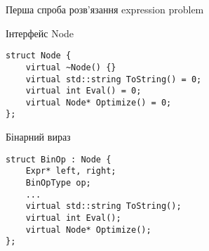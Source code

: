 \documentclass{beamer}
\begin{document}
	\begin{frame}[fragile]{Перша спроба розв'язання expression problem}

 \begin{alertblock}{Інтерфейс Node}
\begin{verbatim}
struct Node {
    virtual ~Node() {}
    virtual std::string ToString() = 0;
	virtual int Eval() = 0;
	virtual Node* Optimize() = 0;
};
\end{verbatim}
 \end{alertblock}
\begin{block}{Бінарний вираз}
\begin{verbatim}
struct BinOp : Node {
	Expr* left, right;
	BinOpType op;
	...
	virtual std::string ToString();
	virtual int Eval();
	virtual Node* Optimize();
};
\end{verbatim}
\end{block}
%
%

	\end{frame}
\end{document}
